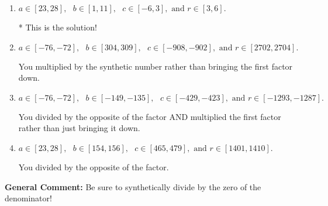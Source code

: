 \documentclass{extbook}[14pt]
\begin{document}
\begin{enumerate}
{\begin{enumerate}[label=\Alph*.]
 You multiplied by the synthetic number and subtracted rather than adding during synthetic division.
\item \( a \in [23, 28], \text{   } b \in [1, 11], \text{   } c \in [-6, 3], \text{   and   } r \in [3, 6]. \)

* This is the solution!
\item \( a \in [-76, -72], \text{   } b \in [304, 309], \text{   } c \in [-908, -902], \text{   and   } r \in [2702, 2704]. \)

 You multiplied by the synthetic number rather than bringing the first factor down.
\item \( a \in [-76, -72], \text{   } b \in [-149, -135], \text{   } c \in [-429, -423], \text{   and   } r \in [-1293, -1287]. \)

 You divided by the opposite of the factor AND multiplied the first factor rather than just bringing it down.
\item \( a \in [23, 28], \text{   } b \in [154, 156], \text{   } c \in [465, 479], \text{   and   } r \in [1401, 1410]. \)

 You divided by the opposite of the factor.
\end{enumerate}

\textbf{General Comment:} Be sure to synthetically divide by the zero of the denominator!
}
\end{enumerate}
\end{document}
